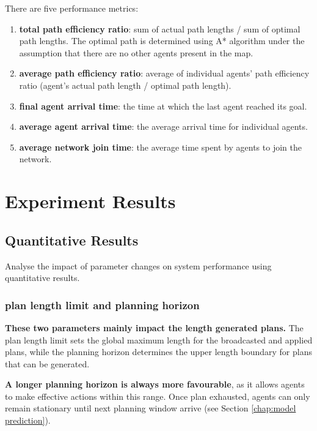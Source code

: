 There are five performance metrics:
\begin{enumerate}
    \item \textbf{total path efficiency ratio}: sum of actual path lengths / sum of optimal path lengths. 
    The optimal path is determined using A* algorithm under the assumption that there are no other agents present in the map.
    \item \textbf{average path efficiency ratio}: average of individual agents' path efficiency ratio (agent's actual path length / optimal path length).
    \item \textbf{final agent arrival time}: the time at which the last agent reached its goal.
    \item \textbf{average agent arrival time}: the average arrival time for individual agents.
    \item \textbf{average network join time}: the average time spent by agents to join the network.
\end{enumerate}

\section{Experiment Results}
\subsection{Quantitative Results}

Analyse the impact of parameter changes on system performance using quantitative results.


\subsubsection{plan length limit and planning horizon}

\textbf{These two parameters mainly impact the length generated plans.} The plan length limit sets the global maximum length for the broadcasted and applied plans, while the planning horizon determines the upper length boundary for plans that can be generated.

\textbf{A longer planning horizon is always more favourable}, as it allows agents to make effective actions within this range. Once plan exhausted, agents can only remain stationary until next planning window arrive (see Section \ref{chap:model prediction}).

